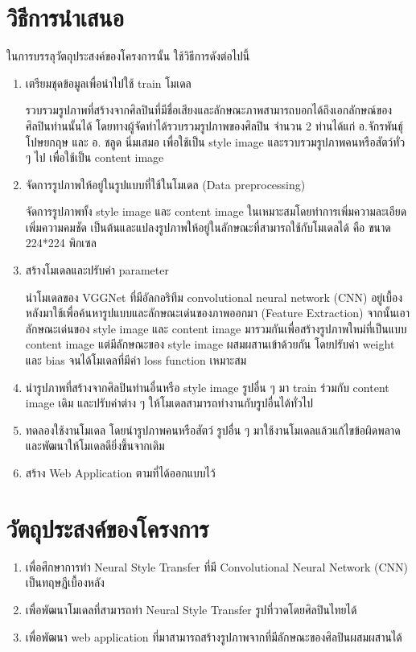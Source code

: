 \documentclass[12pt,oneside,openright,a4paper]{cpe-thai-project}
\begin{document}
\section{วิธีการนำเสนอ}
\par\setlength{\parindent}{5ex}ในการบรรลุวัตถุประสงค์ของโครงการนั้น ใช้วิธีการดังต่อไปนี้
\begin{enumerate}
\item เตรียมชุดข้อมูลเพื่อนำไปใช้ train โมเดล\par\setlength{\parindent}{5ex}รวบรวมรูปภาพที่สร้างจากศิลปินที่มีชื่อเสียงและลักษณะภาพสามารถบอกได้ถึงเอกลักษณ์ของศิลปินท่านนั้นได้ โดยทางผู้จัดทำได้รวบรวมรูปภาพของศิลปิน จำนวน 2 ท่านได้แก่ อ.จักรพันธุ์ โปษยกฤษ และ อ. ชลูด นิ่มเสมอ เพื่อใช้เป็น style image และรวบรวมรูปภาพคนหรือสัตว์ทั่ว ๆ ไป เพื่อใช้เป็น content image
\item จัดการรูปภาพให้อยู่ในรูปแบบที่ใช้ในโมเดล (Data preprocessing)\par\setlength{\parindent}{5ex} จัดการรูปภาพทั้ง style image และ content image ในเหมาะสมโดยทำการเพิ่มความละเอียด เพิ่มความคมชัด เป็นต้นและแปลงรูปภาพให้อยู่ในลักษณะที่สามารถใช้กับโมเดลได้ คือ ขนาด 224*224 พิกเซล
\item สร้างโมเดลและปรับค่า parameter \par\setlength{\parindent}{5ex}นำโมเดลของ VGGNet ที่มีอัลกอริทึม convolutional neural network (CNN) อยู่เบื้องหลังมาใช้เพื่อค้นหารูปแบบและลักษณะเด่นของภาพออกมา (Feature Extraction) จากนั้นเอาลักษณะเด่นของ style image และ content image มารวมกันเพื่อสร้างรูปภาพใหม่ที่เป็นแบบ content image แต่มีลักษณะของ style  image ผสมผสานเข้าด้วยกัน โดยปรับค่า weight และ bias จนได้โมเดลที่มีค่า loss function เหมาะสม
\item นำรูปภาพที่สร้างจากศิลปินท่านอื่นหรือ style image รูปอื่น ๆ มา train ร่วมกับ content image เดิม และปรับค่าต่าง ๆ ให้โมเดลสามารถทำงานกับรูปอื่นได้ทั่วไป
\item ทดลองใช้งานโมเดล โดยนำรูปภาพคนหรือสัตว์ รูปอื่น ๆ มาใช้งานโมเดลแล้วแก้ไขข้อผิดพลาดและพัฒนาให้โมเดลดียิ่งขึ้นจากเดิม
\item สร้าง Web Application ตามที่ได้ออกแบบไว้
\end{enumerate}

\newpage

\section{วัตถุประสงค์ของโครงการ}
\begin{enumerate}
  \item	เพื่อศึกษาการทำ Neural Style Transfer ที่มี Convolutional Neural Network (CNN) เป็นทฤษฎีเบื้องหลัง
  \item เพื่อพัฒนาโมเดลที่สามารถทำ Neural Style Transfer รูปที่วาดโดยศิลปินไทยได้
  \item เพื่อพัฒนา web application ที่มาสามารถสร้างรูปภาพจากที่มีลักษณะของศิลปินผสมผสานได้
\end{enumerate}
\end{document}
